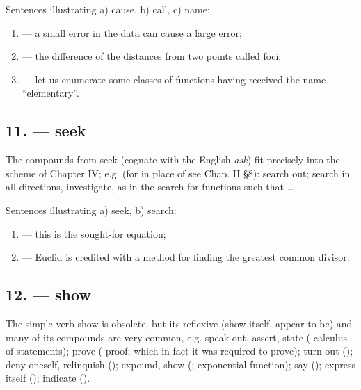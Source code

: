 Sentences illustrating a)  cause, b)  call, c)  name:

\begin{enumerate}[label=\alph*)]
\item {} --- a small error in the data can cause a large error;
\item {} --- the difference of the distances from two points called foci;
\item {} --- let us enumerate some classes of functions having received the name ``elementary''.
\end{enumerate}

\subsection*{11.  --- seek}

The compounds from  seek (cognate with the English \emph{ask}) fit precisely into the scheme of Chapter IV; e.g. (for  in place of  see Chap. II §8):  search out;  search in all directions, investigate, as in  the search for functions such that \ldots

Sentences illustrating a)  seek, b)  search:

\begin{enumerate}[label=\alph*)]
\item {} --- this is the sought-for equation;
\item {} --- Euclid is credited with a method for finding the greatest common divisor.
\end{enumerate}

\subsection*{12.  --- show}

The simple verb  show is obsolete, but its reflexive  (show itself, appear to be) and many of its compounds are very common, e.g.  speak out, assert, state ( calculus of statements);  prove ( proof;  which in fact it was required to prove);  turn out ();  deny oneself, relinquish ();  expound, show (;  exponential function);  say ();  express itself ();  indicate ().

